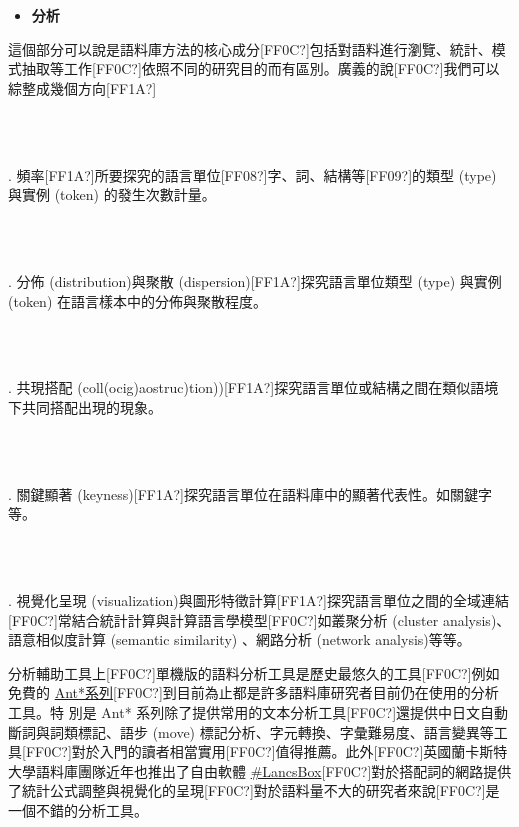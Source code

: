 \begin{itemize}
\item \textbf{分析}

\end{itemize}

這個部分可以說是語料庫方法的核心成分[FF0C?]包括對語料進行瀏覽、統計、模式抽取等工作[FF0C?]依照不同的研究目的而有區別。廣義的說[FF0C?]我們可以綜整成幾個方向[FF1A?]

\ea%
    \label{ex:key:1}
    \gll\\
        \\
    \glt
    \z

        . 頻率[FF1A?]所要探究的語言單位[FF08?]字、詞、結構等[FF09?]的類型 (type) 與實例 (token) 的發生次數計量。

\ea%
    \label{ex:key:2}
    \gll\\
        \\
    \glt
    \z

        . 分佈 (distribution)與聚散 (dispersion)[FF1A?]探究語言單位類型 (type) 與實例 (token) 在語言樣本中的分佈與聚散程度。

\ea%
    \label{ex:key:3}
    \gll\\
        \\
    \glt
    \z

        . 共現搭配 (coll(oc{\textbar}ig)a{\textbar}ostruc)tion))[FF1A?]探究語言單位或結構之間在類似語境下共同搭配出現的現象。

\ea%
    \label{ex:key:4}
    \gll\\
        \\
    \glt
    \z

        . 關鍵顯著 (keyness)[FF1A?]探究語言單位在語料庫中的顯著代表性。如關鍵字等。

\ea%
    \label{ex:key:5}
    \gll\\
        \\
    \glt
    \z

        . 視覺化呈現 (visualization)與圖形特徵計算[FF1A?]探究語言單位之間的全域連結[FF0C?]常結合統計計算與計算語言學模型[FF0C?]如叢聚分析 (cluster analysis)、語意相似度計算 (semantic similarity) 、網路分析 (network analysis)等等。

分析輔助工具上[FF0C?]單機版的語料分析工具是歷史最悠久的工具[FF0C?]例如免費的 \href{http://www.laurenceanthony.net/%20software.html}{Ant*}\href{http://www.laurenceanthony.net/%20software.html}{系列}[FF0C?]到目前為止都是許多語料庫研究者目前仍在使用的分析工具。特 別是 Ant* 系列除了提供常用的文本分析工具[FF0C?]還提供中日文自動斷詞與詞類標記、語步 (move) 標記分析、字元轉換、字彙難易度、語言變異等工具[FF0C?]對於入門的讀者相當實用[FF0C?]值得推薦。此外[FF0C?]英國蘭卡斯特大學語料庫團隊近年也推出了自由軟體 \href{http://corpora.lancs.ac.uk/lancsbox/}{\#LancsBox}[FF0C?]對於搭配詞的網路提供了統計公式調整與視覺化的呈現[FF0C?]對於語料量不大的研究者來說[FF0C?]是一個不錯的分析工具。


